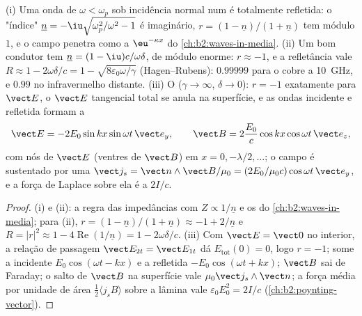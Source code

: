 \begin{proposition}\label{prop:b2:wave-interfaces:conductors}
(i) Uma onda de $\omega < \omega_p$ sob incidência normal num  é totalmente
refletida: o "índice" $\underline n = -\iu\sqrt{\omega_p^2/\omega^2 - 1}$ é imaginário,
$r = (1 - \underline n)/(1 + \underline n)$ tem módulo $1$, e o campo penetra
como a  $\eu^{-\kappa x}$ do \cref{ch:b2:waves-in-media}. (ii) Um
bom condutor tem $\underline n = (1 - \iu)c/\omega\delta$, de módulo enorme: $r \approx
-1$, e a refletância vale $R \approx 1 - 2\omega\delta/c = 1 - \sqrt{8\varepsilon_0\omega/\gamma}$
(Hagen--Rubens): $0.99999$ para o cobre a \qty{10}{GHz}, e $0.99$ no infravermelho
distante. (iii) O \emph{} ($\gamma \to \infty$, $\delta \to 0$):
$r = -1$ exatamente para $\vect E$, o $\vect E$ tangencial total se anula na
superfície, e as ondas incidente e refletida formam a 
\[
\vect E = -2E_0\sin kx\sin\omega t\,\vect e_y , \qquad
\vect B = 2\frac{E_0}c\cos kx\cos\omega t\,\vect e_z ,
\]
com nós de $\vect E$ (ventres de $\vect B$) em $x = 0, -\lambda/2, \dots$; o
campo é sustentado por uma \emph{} $\vect j_s = \vect n\wedge\vect B/
\mu_0 = (2E_0/\mu_0c)\cos\omega t\,\vect e_y$, e a força de Laplace sobre ela é
a  $2I/c$.
\end{proposition}

\begin{proof}
(i) e (ii): a regra das impedâncias com $Z \propto 1/\underline n$ e os  do \cref{ch:b2:waves-in-media}; para (ii), $r = (1 - \underline n)/(1 +
\underline n) \approx -1 + 2/\underline n$ e $R = |r|^2 \approx 1 - 4\operatorname{Re}(1/
\underline n) = 1 - 2\omega\delta/c$. (iii) Com $\vect E = \vect 0$ no interior, a
relação de passagem $\vect E_{2t} = \vect E_{1t}$ dá $E_{\text{tot}}(0) = 0$, logo $r =
-1$; some a incidente $E_0\cos(\omega t - kx)$ e a refletida $-E_0\cos(\omega t + kx)$;
$\vect B$ sai de Faraday; o salto de $\vect B$ na superfície vale $\mu_0\vect j_s
\wedge\vect n$; a força média por unidade de área $\tfrac12\langle j_sB\rangle$ sobre
a lâmina vale $\varepsilon_0E_0^2 = 2I/c$ (\cref{ch:b2:poynting-vector}).
\end{proof}

